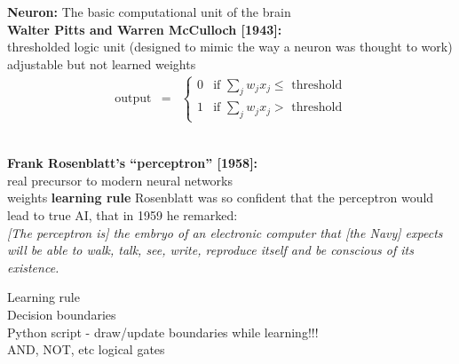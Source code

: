 \documentclass[10pt, compress]{beamer}
\begin{document}
\begin{frame}
  \vspace*{1cm}
  \textbf{Neuron:} The basic computational unit of the brain  \\
  \textbf{Walter Pitts and Warren McCulloch [1943]:}\\
  thresholded logic unit (designed to mimic the way a neuron was thought to work) \\
  adjustable but not learned weights \\
  \vspace*{-.5cm}
  \begin{eqnarray}
  \mbox{output} & = & \left\{ \begin{array}{ll}
  0 & \mbox{if } \sum_j w_j x_j \leq \mbox{ threshold} \\
  1 & \mbox{if } \sum_j w_j x_j > \mbox{ threshold}
  \end{array} \right.
  \nonumber
  \end{eqnarray}
  \hrulefill \\
  \begin{figure}[ht]
  	\centering
  	\qquad
  \end{figure}
\end{frame}

\begin{frame}
\textbf{Frank Rosenblatt’s “perceptron” [1958]:} \\real precursor to modern neural networks \\
weights \textbf{learning rule}
Rosenblatt was so confident that the perceptron would lead to true AI, that in 1959 he remarked: \\
\textit{[The perceptron is] the embryo of an electronic computer that [the Navy] expects will be able to walk, talk, see, write, reproduce itself and be conscious of its existence.}

Learning rule \\
Decision boundaries \\
Python script - draw/update boundaries while learning!!! \\
AND, NOT, etc logical gates

\end{frame}
\end{document}
